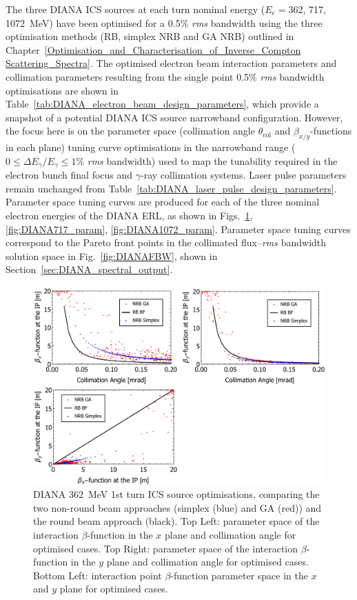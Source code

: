 \documentclass[../main.tex]{subfiles}
\begin{document}
The three DIANA ICS sources at each turn nominal energy ($E_{e}=$362, 717, 1072~\si{\mega\electronvolt}) have been optimised for a 0.5\% \textit{rms} bandwidth using the three optimisation methods (RB, simplex NRB and GA NRB) outlined in Chapter~\ref{Optimisation_and_Characterisation_of_Inverse_Compton Scattering_Spectra}. The optimised electron beam interaction parameters and collimation parameters resulting from the single point 0.5\% \textit{rms} bandwidth optimisations are shown in Table~\ref{tab:DIANA_electron_beam_design_parameters}, which provide a snapshot of a potential DIANA ICS source narrowband configuration. However, the focus here is on the parameter space (collimation angle $\theta_{\mathrm{col}}$ and $\beta_{x/y}$-functions in each plane) tuning curve optimisations in the narrowband range ($0 \leq \Delta E_{\gamma}/E_{\gamma} \leq 1$\% \textit{rms} bandwidth) used to map the tunability required in the electron bunch final focus and $\gamma$-ray collimation systems. Laser pulse parameters remain unchanged from Table~\ref{tab:DIANA_laser_pulse_design_parameters}. Parameter space tuning curves are produced for each of the three nominal electron energies of the DIANA ERL, as shown in Figs.~\ref{fig:DIANA362_param}, \ref{fig:DIANA717_param}, \ref{fig:DIANA1072_param}. Parameter space tuning curves correspond to the Pareto front points in the collimated flux--\textit{rms} bandwidth solution space in Fig.~\ref{fig:DIANAFBW}, shown in Section~\ref{sec:DIANA_spectral_output}.

\begin{figure}[!h]
\centering
\includegraphics[width=\textwidth]{Figures/DIANA_Inverse_Compton_Source_Design/DIANA362param.pdf}
\caption{DIANA 362~\si{\mega\electronvolt} 1st turn ICS source optimisations, comparing the two non-round beam approaches (simplex (blue) and GA (red)) and the round beam approach (black). Top Left: parameter space of the interaction $\beta$-function in the $x$ plane and collimation angle for optimised cases. Top Right: parameter space of the interaction $\beta$-function in the $y$ plane and collimation angle for optimised cases.  Bottom Left: interaction point $\beta$-function parameter space in the $x$ and $y$ plane for optimised cases.}
\label{fig:DIANA362_param}
\end{figure}
\end{document}
